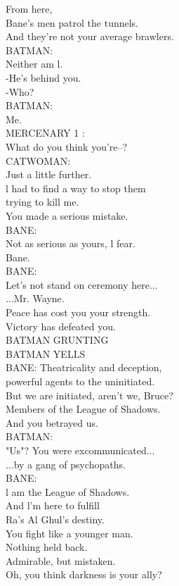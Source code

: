 \documentclass{article}
\begin{document}
\begin{multicols}{3}
From here,\\
Bane's men patrol the tunnels.\\
And they're not your average brawlers.\\
BATMAN:\\
Neither am l.\\
-He's behind you.\\
-Who?\\
BATMAN:\\
Me.\\
MERCENARY 1 :\\
What do you think you're--?\\
CATWOMAN:\\
Just a little further.\\
l had to find a way to stop them\\
trying to kill me.\\
You made a serious mistake.\\
BANE:\\
Not as serious as yours, l fear.\\
Bane.\\
BANE:\\
Let's not stand on ceremony here...\\
...Mr. Wayne.\\
Peace has cost you your strength.\\
Victory has defeated you.\\
BATMAN GRUNTING\\
BATMAN YELLS\\
BANE: Theatricality and deception,\\
powerful agents to the uninitiated.\\
But we are initiated, aren't we, Bruce?\\
Members of the League of Shadows.\\
And you betrayed us.\\
BATMAN:\\
"Us"? You were excommunicated...\\
...by a gang of psychopaths.\\
BANE:\\
l am the League of Shadows.\\
And l'm here to fulfill\\
Ra's Al Ghul's destiny.\\
You fight like a younger man.\\
Nothing held back.\\
Admirable, but mistaken.\\
Oh, you think darkness is your ally?\\

\end{multicols}
\end{document}
